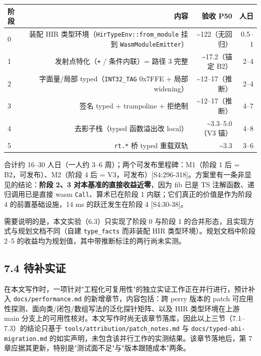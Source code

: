 \documentclass[11pt, a4paper]{article}
\begin{document}
\begin{center}\small\begin{tabular}{lrrr}
\toprule
阶段 & 内容 & 验收 P50 & 人日 \\
\midrule
0 & 装配 HIR 类型环境（\texttt{HirTypeEnv::from\_module} 挂到 \texttt{WasmModuleEmitter}） & \textasciitilde{}122（无回归） & 0.5–1 \\
1 & 发射点特化（\texttt{+} / 条件内联）= 路径 3 完整 & \textasciitilde{}17.2（锚定 B2） & 2–4 \\
2 & 字面量/局部 typed（\texttt{INT32\_TAG} 0x7FFE + 局部 widening） & \textasciitilde{}12–17（推断） & 2–4 \\
3 & 签名 typed + trampoline + 拒绝制 & \textasciitilde{}12–17（推断） & 4–7 \\
4 & 去影子栈（typed 函数溢出改 local） & \textasciitilde{}3.3–5.0（V3 锚） & 4–8 \\
5 & \texttt{rt.*} 桥 typed 重载双轨 & \textasciitilde{}3.3 & 3–6 \\
\bottomrule
\end{tabular}\end{center}


合计约 16–30 人日（一人约 3–6 周）；两个可发布里程碑：M1（阶段 1 后 = B2，可发布）、M2（阶段 4 后 = V3，可发布）[S4:296-318]。方案里有一条非显见的结论：\textbf{阶段 2、3 对本基准的直接收益近零}，因为 fib 已是 TS 注解函数、递归调用已是直接 wasm \texttt{Call}、算术已在阶段 1 内联；它们真正的价值是作为阶段 4 的前置基础设施，14 ms 的跃迁发生在阶段 4 [S4:30-38]。


需要说明的是，本文实验（6.3）只实现了阶段 0 与阶段 1 的合并形态，且实现方式与规划文档不同（自建 \texttt{type\_facts} 而非装配 HIR 类型环境）。规划文档中阶段 2–5 的收益均为规划值，其中带推断标注的两行尚未实测。


\subsection{7.4 待补实证}

在本文写作时，一项针对"工程化可复用性"的独立实证工作正在并行进行，预计补入 \texttt{docs/performance.md} 的新增章节，内容包括：跨 perry 版本的 patch 可应用性探测、面向类/闭包/数组写法的泛化探针矩阵、以及 HIR 类型环境在上游 main 分支上的可用性核对。本文写作时尚无该章节落库，因此以上三节（7.1–7.3）的结论只基于 \texttt{tools/attribution/patch\_notes.md} 与 \texttt{docs/typed-abi-migration.md} 的如实声明，未包含该并行工作的实测结果。该章节落地后，第 7 章应据其更新，特别是"测试面不足"与"版本跟随成本"两条。
\end{document}
